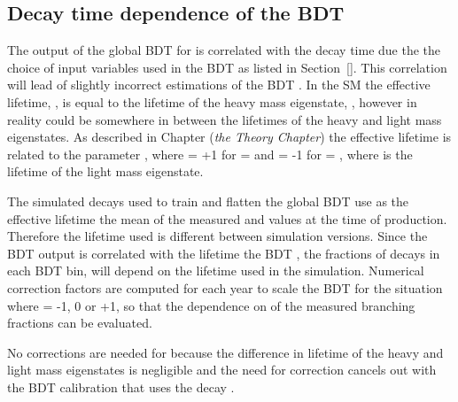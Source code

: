 \subsection{Decay time dependence of the \bsmumu BDT \pdf}
\label{sec:ADGBDTcorrections}
The output of the global BDT for \bmumu is correlated with the \bmumu decay time due the the choice of input variables used in the BDT as listed in Section~\ref{}. This correlation will lead of slightly incorrect estimations of the \bsmumu BDT \pdf. In the SM the \bsmumu effective lifetime, \tmumu, is equal to the lifetime of the heavy \bs mass eigenstate, \tH, however in reality \tmumu could be somewhere in between the lifetimes of the heavy and light mass eigenstates. As described in Chapter ({\it the Theory Chapter}) the \bsmumu effective lifetime is related to the parameter \ADG, where \ADG = +1 for \tmumu = \tH and \ADG = -1 for \tmumu = \tL, where \tL is the lifetime of the light \bsmumu mass eigenstate.

The simulated decays used to train and flatten the global BDT use as the \bsmumu effective lifetime the mean of the measured \tH and \tL values at the time of production. Therefore the lifetime used is different between simulation versions. Since the BDT output is correlated with the lifetime the BDT \pdf, the fractions of \bsmumu decays in each BDT bin, will depend on the lifetime used in the simulation. Numerical correction factors are computed for each year to scale the BDT \pdf for the situation where \ADF = -1, 0 or +1, so that the dependence on \ADG of the measured branching fractions can be evaluated.

No corrections are needed for \bdmumu because the difference in lifetime of the heavy and light \bd mass eigenstates  is negligible and the need for correction cancels out with the BDT calibration that uses the \bd decay \bdkpi. 


